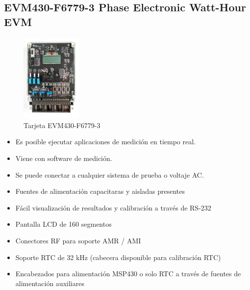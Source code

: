     \subsection{EVM430-F6779-3 Phase Electronic Watt-Hour EVM}
        \begin{figure}
            \centering
            \includegraphics[width = 3cm]{3Proyecto/EVM430-F6779}
            \caption{Tarjeta EVM430-F6779-3} 
            \label{fig:EVM430-F6779-3}
        \end{figure} 
        \begin{itemize}
            \itemsep0em
            \item Es posible ejecutar aplicaciones de medición en tiempo real.
            \item Viene con software de medición.
            \item Se puede conectar a cualquier sistema de prueba o voltaje AC.
            \item Fuentes de alimentación capacitaras y aisladas presentes
            \item Fácil visualización de resultados y calibración a través de RS-232
            \item Pantalla LCD de 160 segmentos
            \item Conectores RF para soporte AMR / AMI
            \item Soporte RTC de 32 kHz (cabecera disponible para calibración RTC)
            \item Encabezados para alimentación MSP430 o solo  RTC a través de fuentes de alimentación auxiliares
        \end{itemize}
